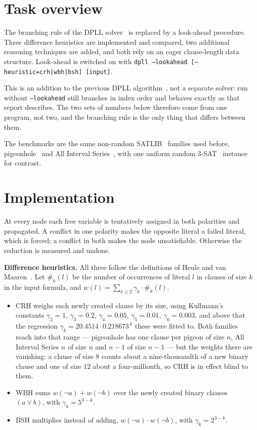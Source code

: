 \documentclass[11pt,a4paper]{article}
\begin{document}
\makereporttitle

\section{Task overview}

The branching rule of the DPLL solver~\cite{dpllreport} is replaced by a
look-ahead procedure. Three difference heuristics are implemented and compared,
two additional reasoning techniques are added, and both rely on an eager
clause-length data structure. Look-ahead is switched on with
\texttt{dpll --lookahead [--heuristic=crh|wbh|bsh] [input]}.

This is an addition to the previous DPLL algorithm~\cite{dpllreport}, not a
separate solver: run without \texttt{--lookahead} still branches in index
order and behaves exactly as that report describes. The two sets of numbers below therefore come
from one program, not two, and the branching rule is the only thing that
differs between them.

The benchmarks are the same non-random SATLIB~\cite{satlib} families used
before, pigeonhole~\cite{phole} and All Interval Series~\cite{ais}, with one
uniform random 3-SAT~\cite{uf} instance for contrast.

\section{Implementation}

At every node each free variable is tentatively assigned in both polarities and
propagated. A conflict in one polarity makes the opposite literal a failed
literal, which is forced; a conflict in both makes the node unsatisfiable.
Otherwise the reduction is measured and undone.

\textbf{Difference heuristics.} All three follow the definitions of Heule and
van Maaren~\cite{handbook}. Let $\#_k(l)$ be the number of occurrences of
literal $l$ in clauses of size $k$ in the input formula, and
$w(l) = \sum_{k \ge 2} \gamma_k \cdot \#_k(l)$.

\begin{itemize}
\item CRH weighs each newly created clause by its size, using Kullmann's
      constants $\gamma_2 = 1$, $\gamma_3 = 0.2$, $\gamma_4 = 0.05$,
      $\gamma_5 = 0.01$, $\gamma_6 = 0.003$, and above that the regression
      $\gamma_k = 20.4514 \cdot 0.218673^{\,k}$ these were fitted to.
      Both families reach into that range --- pigeonhole has one clause per
      pigeon of size $n$, All Interval Series $n$ of size $n$ and $n-1$ of
      size $n-1$ --- but the weights there are vanishing: a clause of size
      $8$ counts about a nine-thousandth of a new binary clause and one of
      size $12$ about a four-millionth, so CRH is in effect blind to them.
\item WBH sums $w(\lnot a) + w(\lnot b)$ over the newly created binary clauses
      $(a \vee b)$, with $\gamma_k = 5^{3-k}$.
\item BSH multiplies instead of adding, $w(\lnot a) \cdot w(\lnot b)$, with
      $\gamma_k = 2^{3-k}$.
\end{itemize}
\end{document}
